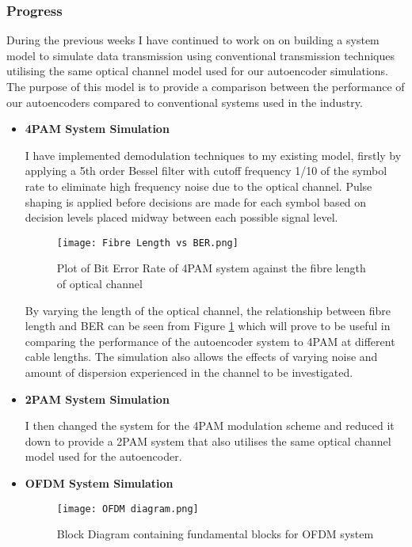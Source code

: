 \subsubsection{Progress}

During the previous weeks I have continued to work on on building a system model to simulate data transmission using conventional transmission techniques utilising the same optical channel model used for our autoencoder simulations. The purpose of this model is to provide a comparison between the performance of our autoencoders compared to conventional systems used in the industry.

\begin{itemize}
    \item \textbf{4PAM System Simulation}
    
    I have implemented demodulation techniques to my existing model, firstly by applying a 5th order Bessel filter with cutoff frequency 1/10 of the symbol rate to eliminate high frequency noise due to the optical channel. Pulse shaping is applied before decisions are made for each symbol based on decision levels placed midway between each possible signal level.
    
    \begin{figure}[H]
	\centering
	\texttt{[image: Fibre Length vs BER.png]}
	\caption{Plot of Bit Error Rate of 4PAM system against the fibre length of optical channel}
	\label{fig:output_signal}	
    \end{figure}
    
    By varying the length of the optical channel, the relationship between fibre length and BER can be seen from Figure \ref{fig:output_signal} which will prove to be useful in comparing the performance of the autoencoder system to 4PAM at different cable lengths. The simulation also allows the effects of varying noise and amount of dispersion experienced in the channel to be investigated.
    
    \item \textbf{2PAM System Simulation}
    
    I then changed the system for the 4PAM modulation scheme and reduced it down to provide a 2PAM system that also utilises the same optical channel model used for the autoencoder. 
    
    \item \textbf{OFDM System Simulation}
    
    \begin{figure}[H]
	\centering
	\texttt{[image: OFDM diagram.png]}
	\caption{Block Diagram containing fundamental blocks for OFDM system}
	\label{fig:OFDM}	
    \end{figure}
    

\end{itemize}
